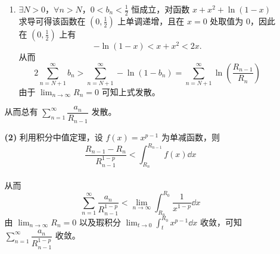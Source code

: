 \documentclass{ctexart}
\begin{document}
\begin{enumerate}
\begin{enumerate}
\begin{enumerate}
            \item $\exists N>0$，$\forall n>N$，$0<b_n<\frac{1}{2}$ 恒成立，对函数 $x+x^2+\ln(1-x)$ 求导可得该函数在 $(0,\frac{1}{2})$ 上单调递增，且在 $x=0$ 处取值为 $0$，因此在 $(0,\frac{1}{2})$ 上有 \[-\ln(1-x)<x+x^2<2x.\]
            从而 \[2\sum_{n=N+1}^{\infty}b_n >\sum_{n=N+1}^{\infty}-\ln(1-b_n)=\sum_{n=N+1}^{\infty}\ln(\dfrac{R_{n-1}}{R_n})\]
            由于 $\displaystyle\lim_{n\to\infty}R_n=0$ 可知上式发散。
        \end{enumerate}
        从而总有 $\displaystyle\sum_{n=1}^{\infty}\dfrac{a_n}{R_{n-1}}$ 发散。
        \item[\textbf{(2)}] 利用积分中值定理，设 $f(x)=x^{p-1}$ 为单减函数，则 \[\dfrac{R_{n-1}-R_n}{R_{n-1}^{1-p}}<\int_{R_n}^{R_{n-1}}f(x)\dd{x}\] \\
        从而 \[\sum_{n=1}^{\infty}\dfrac{a_n}{R_{n-1}^{1-p}}<\lim_{n\to\infty}\int_{R_n}^{R_0}\dfrac{1}{x^{1-p}}\dd{x}\]
        由 $\displaystyle\lim_{n\to\infty}R_n=0$ 以及瑕积分 $\displaystyle\lim_{t\to 0}\int_t^{R_0}x^{p-1}\dd{x}$ 收敛，可知 $\displaystyle\sum_{n=1}^{\infty}\dfrac{a_n}{R_{n-1}^{1-p}}$ 收敛。
    \end{enumerate}
\end{enumerate}
\end{document}
